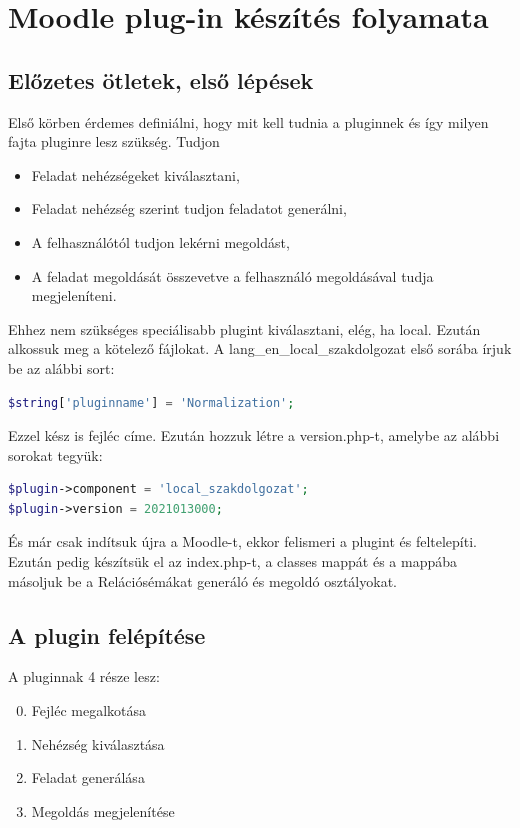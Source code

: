 \chapter{Moodle plug-in készítés folyamata}

\section{Előzetes ötletek, első lépések}

Első körben érdemes definiálni, hogy mit kell tudnia a pluginnek és így milyen fajta pluginre lesz szükség. Tudjon
\begin{itemize}
    \item Feladat nehézségeket kiválasztani,
    \item Feladat nehézség szerint tudjon feladatot generálni,
    \item A felhasználótól tudjon lekérni megoldást,
    \item A feladat megoldását összevetve a felhasználó megoldásával tudja megjeleníteni.
\end{itemize}

Ehhez nem szükséges speciálisabb plugint kiválasztani, elég, ha local. Ezután alkossuk meg a kötelező fájlokat. A lang\_en\_local\_szakdolgozat első sorába írjuk be az alábbi sort:

\begin{lstlisting}[language=php]
$string['pluginname'] = 'Normalization';
\end{lstlisting}

Ezzel kész is fejléc címe. Ezután hozzuk létre a version.php-t, amelybe az alábbi sorokat tegyük:

\begin{lstlisting}[language=php]
$plugin->component = 'local_szakdolgozat';
$plugin->version = 2021013000;
\end{lstlisting}

És már csak indítsuk újra a Moodle-t, ekkor felismeri a plugint és feltelepíti. Ezután pedig készítsük el az index.php-t, a classes mappát és a mappába másoljuk be a Relációsémákat generáló és megoldó osztályokat.

\section{A plugin felépítése}

A pluginnak 4 része lesz:
\begin{enumerate}\setcounter{enumi}{-1}
    \item Fejléc megalkotása
    \item Nehézség kiválasztása
    \item Feladat generálása
    \item Megoldás megjelenítése
\end{enumerate}

